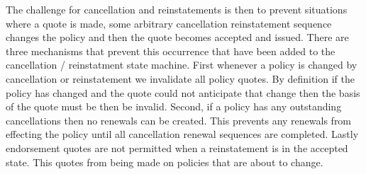 The challenge for cancellation and reinstatements is then to prevent situations where a quote is made, some arbitrary cancellation
reinstatement sequence changes the policy and then the quote becomes accepted and issued. There are three mechanisms that
prevent this occurrence that have been added to the cancellation / reinstatment state machine. First whenever a policy is
changed by cancellation or reinstatement we invalidate all policy quotes. By definition if the policy has changed and the quote
could not anticipate that change then the basis of the quote must be then be invalid. Second, if a policy has any outstanding
cancellations then no renewals can be created. This prevents any renewals from effecting the policy until all cancellation
renewal sequences are completed. Lastly endorsement quotes are not permitted when a reinstatement is in the accepted state. This
quotes from being made on policies that are about to change.

